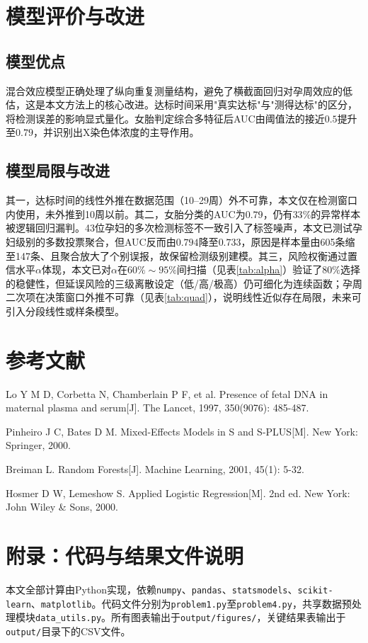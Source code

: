 \documentclass[12pt]{ctexart}
\begin{document}
\section{模型评价与改进}

\subsection{模型优点}
混合效应模型正确处理了纵向重复测量结构，避免了横截面回归对孕周效应的低估，这是本文方法上的核心改进。达标时间采用"真实达标"与"测得达标"的区分，将检测误差的影响显式量化。女胎判定综合多特征后AUC由阈值法的接近$0.5$提升至$0.79$，并识别出X染色体浓度的主导作用。

\subsection{模型局限与改进}
其一，达标时间的线性外推在数据范围（10--29周）外不可靠，本文仅在检测窗口内使用，未外推到10周以前。其二，女胎分类的AUC为$0.79$，仍有$33\%$的异常样本被逻辑回归漏判。43位孕妇的多次检测标签不一致引入了标签噪声，本文已测试孕妇级别的多数投票聚合，但AUC反而由$0.794$降至$0.733$，原因是样本量由605条缩至147条、且聚合放大了个别误报，故保留检测级别建模。其三，风险权衡通过置信水平$\alpha$体现，本文已对$\alpha$在$60\%\sim95\%$间扫描（见表\ref{tab:alpha}）验证了$80\%$选择的稳健性，但延误风险的三级离散设定（低/高/极高）仍可细化为连续函数；孕周二次项在决策窗口外推不可靠（见表\ref{tab:quad}），说明线性近似存在局限，未来可引入分段线性或样条模型。

\section{参考文献}

\begin{enumerate}[label={[\arabic*]}]
    \item Lo Y M D, Corbetta N, Chamberlain P F, et al. Presence of fetal DNA in maternal plasma and serum[J]. The Lancet, 1997, 350(9076): 485-487.
    \item Pinheiro J C, Bates D M. Mixed-Effects Models in S and S-PLUS[M]. New York: Springer, 2000.
    \item Breiman L. Random Forests[J]. Machine Learning, 2001, 45(1): 5-32.
    \item Hosmer D W, Lemeshow S. Applied Logistic Regression[M]. 2nd ed. New York: John Wiley \& Sons, 2000.
\end{enumerate}

\section*{附录：代码与结果文件说明}

本文全部计算由Python实现，依赖\texttt{numpy}、\texttt{pandas}、\texttt{statsmodels}、\texttt{scikit-learn}、\texttt{matplotlib}。代码文件分别为\texttt{problem1.py}至\texttt{problem4.py}，共享数据预处理模块\texttt{data\_utils.py}。所有图表输出于\texttt{output/figures/}，关键结果表输出于\texttt{output/}目录下的CSV文件。
\end{document}
